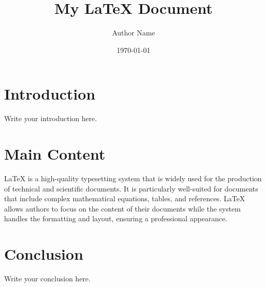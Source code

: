 \documentclass{article}
\title{My LaTeX Document}
\author{Author Name}
\date{\today}
\begin{document}
\maketitle

\section{Introduction}
Write your introduction here.

\section{Main Content}
LaTeX is a high-quality typesetting system that is widely used for the production of technical and scientific documents. It is particularly well-suited for documents that include complex mathematical equations, tables, and references. LaTeX allows authors to focus on the content of their documents while the system handles the formatting and layout, ensuring a professional appearance.

\section{Conclusion}
Write your conclusion here.
\end{document}
